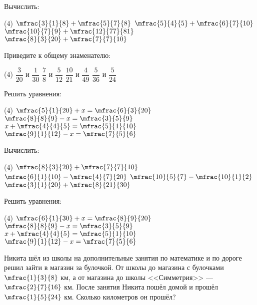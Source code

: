 %
%
\begin{class}[number=6]
	\begin{listofex}
		\item Вычислить:
		\begin{tasks}(4)
			\task \( \mfrac{3}{1}{8}+\mfrac{5}{7}{8} \)
			\task \( \mfrac{5}{4}{5}+\mfrac{6}{7}{10} \)
			\task \( \mfrac{10}{7}{9}+\mfrac{12}{77}{81} \)
			\task \( \mfrac{8}{3}{20}+\mfrac{7}{7}{10}\)
		\end{tasks}
		\item Приведите к общему знаменателю:
		\begin{tasks}(4)
			\task \( \dfrac{3}{20} \) и \( \dfrac{1}{30} \)
			\task \( \dfrac{7}{8} \) и \( \dfrac{5}{12} \)
			\task \( \dfrac{10}{21} \) и \( \dfrac{4}{49} \)
			\task \( \dfrac{5}{36} \) и \( \dfrac{5}{24} \)
		\end{tasks}
		\item Решить уравнения:
		\begin{tasks}(4)
			\task \( \mfrac{5}{1}{20}+x=\mfrac{6}{3}{20} \)
			\task \( \mfrac{8}{8}{9}-x=\mfrac{3}{5}{9} \)
			\task \( x+\mfrac{4}{4}{5}=\mfrac{5}{1}{10} \)
			\task \( \mfrac{9}{1}{12}-x=\mfrac{7}{5}{6} \)
		\end{tasks}
	\end{listofex}
\end{class}
%
%
\begin{homework}[number=2]
	\begin{listofex}
		\item Вычислить:
		\begin{tasks}(4)
			\task \( \mfrac{8}{3}{20}+\mfrac{7}{7}{10}\)
			\task \( \mfrac{6}{1}{10}-\mfrac{4}{7}{20} \)
			\task \( \mfrac{10}{5}{7}-\mfrac{10}{1}{2} \)
			\task \( \mfrac{3}{1}{20}+\mfrac{8}{21}{30} \)
		\end{tasks}
		\item Решить уравнения:
		\begin{tasks}(4)
			\task \( \mfrac{6}{1}{30}+x=\mfrac{8}{9}{20} \)
			\task \( \mfrac{8}{8}{9}-x=\mfrac{3}{5}{9} \)
			\task \( x+\mfrac{4}{4}{5}=\mfrac{5}{1}{10} \)
			\task \( \mfrac{9}{1}{12}-x=\mfrac{7}{5}{6} \)
		\end{tasks} 
		\item Никита шёл из школы на дополнительные занятия по математике и по дороге решил зайти в магазин за булочкой. От школы до магазина с булочками \( \mfrac{1}{3}{8} \) км, а от магазина до школы <<Симметрия>> --- \( \mfrac{2}{7}{16} \) км. После занятия Никита пошёл домой и прошёл \( \mfrac{1}{5}{24} \) км. Сколько километров он прошёл?
	\end{listofex}
\end{homework}
%
%
%
%

